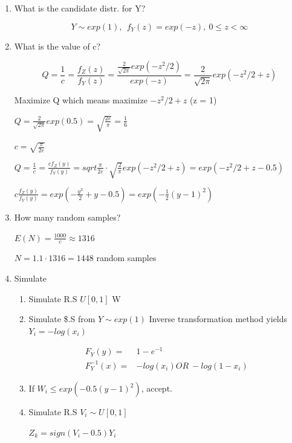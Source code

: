 \documentclass[11pt]{article}
\begin{document}
\begin{enumerate}
\item What is the candidate distr. for Y?

$$
   Y \sim exp(1), \ \ f_Y(z) = exp(- z), \ 0 \leq z < \infty
   $$

\item What is the value of c?

$$
   Q = \frac{1}{c} = \frac{f_Z(z)}{f_Y(z)} = \frac{\frac{2}{\sqrt{2 \pi}}
   exp(-z^2/2)}{exp(-z)} = \frac{2}{\sqrt{2 \pi}} exp(-z^2/2 + z)
   $$

Maximize Q which means maximize \(-z^2/2 + z\) (z = 1)

\(Q = \frac{2}{\sqrt{2 \pi}} exp(0.5) = \sqrt{\frac{2e}{\pi}} = \frac{1}{6}\)

\(c = \sqrt{\frac{\pi}{2e}}\)

\(Q = \frac{1}{c} = \frac{c f_Z(y)}{f_Y(y)} = sqrt{\frac{\pi}{2e}} \cdot \sqrt{\frac{2}{\pi}} exp(-z^2/2 + z) = exp(-z^2/2 + z - 0.5)\)

\(c \frac{f_Z(y)}{f_Y(y)} = exp(- \frac{y^2}{2} + y - 0.5) = exp(-\frac{1}{2}(y - 1)^2)\)

\item How many random samples?

\(E(N) = \frac{1000}{c} \approx 1316\)

\(N = 1.1 \cdot 1316 = 1448\) random samples

\item Simulate

\begin{enumerate}
\item Simulate R.S \(U[0,1]\) W
\item Simulate \$.S from \(Y \sim exp(1)\)
Inverse transformation method yields \(Y_i = - log(x_i)\)

\begin{equation}
\begin{split}
F_Y(y) = & 1 - e^{-1}\\
F_Y^{-1}(x) = & -log(x_i) OR \ -log(1 - x_i)
\end{split}
\end{equation}

\item If \(W_i \leq exp(-0.5(y - 1)^2)\), accept.
\item Simulate R.S \(V_i \sim U[0,1]\)

\(Z_k = sign(V_i - 0.5) Y_i\)
\end{enumerate}
\end{enumerate}
\end{document}

